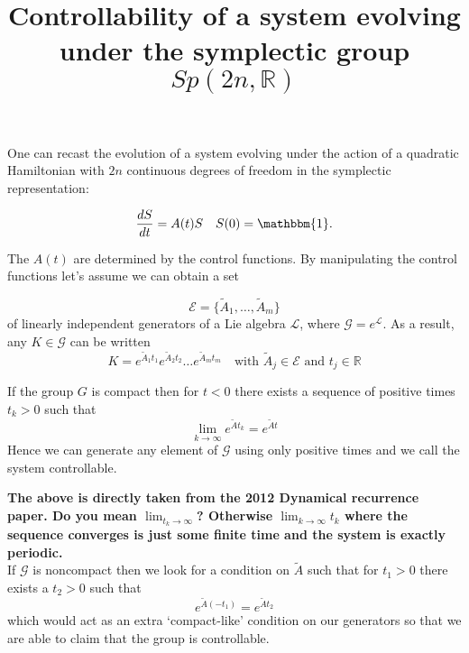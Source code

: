


\title{Controllability of a system evolving under the symplectic group $Sp(2n,\mathbb{R})$}
\maketitle

One can recast the evolution of a system evolving under the action of a quadratic Hamiltonian with $2n$ continuous degrees of freedom in the symplectic representation:

\begin{equation}
\d{S}{t} = A(t)S \quad S(0) = \mathbbm{1}.
\end{equation}

The $A(t)$ are determined by the control functions. By manipulating the control functions let's assume we can obtain a set

\begin{equation}
\mathcal{E} = \{ \tilde{A}_1, \ldots, \tilde{A}_m\}
\end{equation}
of linearly independent generators of a Lie algebra $\mathcal{L}$, where $\mathcal{G} = e^{\mathcal{L}}$. As a result, any $K \in \mathcal{G}$ can be written
\begin{equation}
K = e^{\tilde{A}_1t_1}e^{\tilde{A}_2t_2}\ldots e^{\tilde{A}_mt_m} \quad \text{with } \tilde{A}_j \in \mathcal{E} \text{ and } t_j  \in \mathbb{R}
\end{equation}

If the group $G$ is compact then for $t < 0$ there exists a sequence of positive times $t_k >0$ such that 
\begin{equation}
\lim_{k \to \infty} e^{\tilde{A}t_k} = e^{\tilde{A}t}
\end{equation}
Hence we can generate any element of $\mathcal{G}$ using only positive times and we call the system controllable.

\textbf{The above is directly taken from the 2012 Dynamical recurrence paper. Do you mean $\lim_{t_k \to \infty}$? Otherwise $\lim_{k \to \infty} t_k$ where the sequence converges is just some finite time and the system is exactly periodic.} \\

If $\mathcal{G}$ is noncompact then we look for a condition on $\tilde{A}$ such that for $t_1 > 0$ there exists a $t_2 > 0$ such that 
\begin{equation}
e^{\tilde{A}(-t_1)} = e^{\tilde{A}t_2}
\end{equation}
which would act as an extra `compact-like' condition on our generators so that we are able to claim that the group is controllable.

